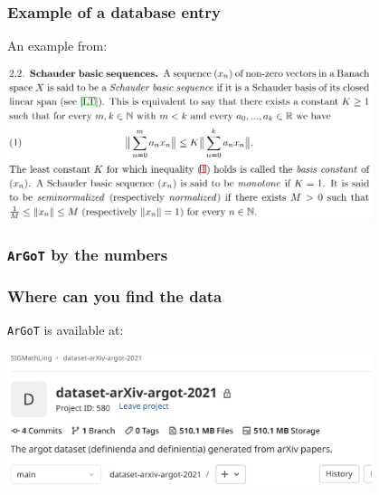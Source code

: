 \documentclass{beamer}
\newcommand{\argot}{\texttt{ArGoT}\xspace}
\begin{document}
\begin{frame}
    \frametitle{Example of a database entry}
    An example from: 
    \begin{center}
        \includegraphics[width=0.8\textwidth]{def2.png}
    \end{center}
    \pause
    \exampleCode
\end{frame}


\begin{frame}
    \frametitle{\argot by the numbers}
    \begin{center}
        
\end{center}
\end{frame}



\begin{frame}
    \frametitle{Where can you find the data}
    \argot is available at: 
    \begin{center}
        \includegraphics[width=0.8\textwidth]{download1.png}
    \end{center}

\end{frame}
\end{document}
